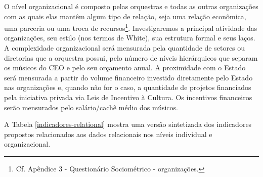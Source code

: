 \documentclass[a4paper, 12pt, openright, oneside, german, french, english, brazil]{abntex2}
\begin{document}
	O nível organizacional é composto pelas orquestras e todas as outras organizações com as quais elas mantêm algum tipo de relação, seja uma relação econômica, uma parceria ou uma troca de recursos\footnote{Cf. Apêndice 3 - Questionário Sociométrico - organizações.}. Investigaremos a principal atividade das organizações, seu estilo (nos termos de White), sua estrutura formal e seus laços. 
	A complexidade organizacional será mensurada pela quantidade de setores ou diretorias que a orquestra possui, pelo número de níveis hierárquicos que separam os músicos do CEO e pelo seu orçamento anual. A proximidade com o Estado será mensurada a partir do volume financeiro investido diretamente pelo Estado nas organizações e, quando não for o caso, a quantidade de projetos financiados pela iniciativa privada via Leis de Incentivo à Cultura. Os incentivos financeiros serão mensurados pelo salário/cachê médio dos músicos.
	
	
	
	A Tabela \ref{indicadores-relational} mostra uma versão sintetizada dos indicadores propostos relacionados aos dados relacionais nos níveis individual e organizacional.
	
	
\end{document}
